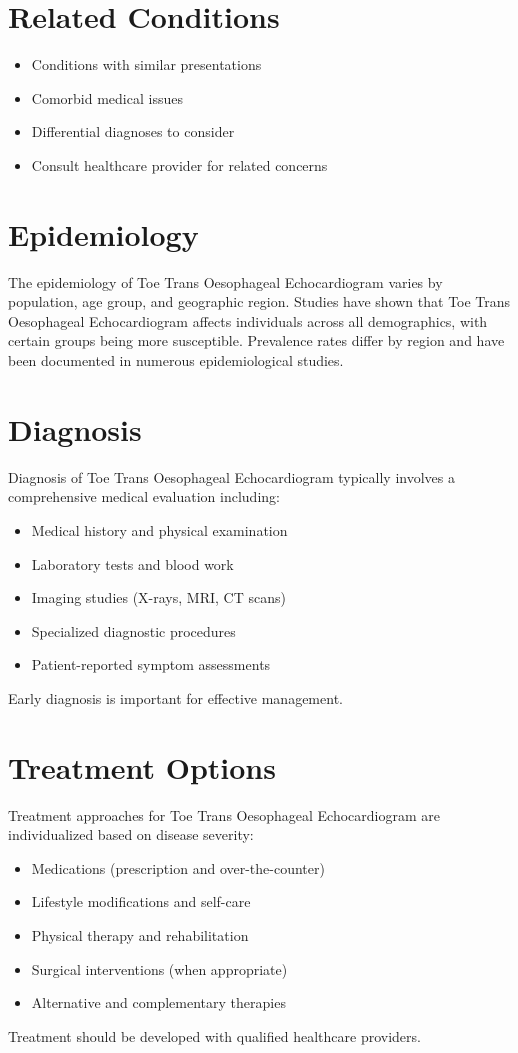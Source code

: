 \section*{Related Conditions}
\begin{itemize}
  \item Conditions with similar presentations
  \item Comorbid medical issues
  \item Differential diagnoses to consider
  \item Consult healthcare provider for related concerns
\end{itemize}

\section*{Epidemiology}
The epidemiology of Toe Trans Oesophageal Echocardiogram varies by population, age group, and geographic region. Studies have shown that Toe Trans Oesophageal Echocardiogram affects individuals across all demographics, with certain groups being more susceptible. Prevalence rates differ by region and have been documented in numerous epidemiological studies.

\section*{Diagnosis}
Diagnosis of Toe Trans Oesophageal Echocardiogram typically involves a comprehensive medical evaluation including:
\begin{itemize}
  \item Medical history and physical examination
  \item Laboratory tests and blood work
  \item Imaging studies (X-rays, MRI, CT scans)
  \item Specialized diagnostic procedures
  \item Patient-reported symptom assessments
\end{itemize}
Early diagnosis is important for effective management.

\section*{Treatment Options}
Treatment approaches for Toe Trans Oesophageal Echocardiogram are individualized based on disease severity:
\begin{itemize}
  \item Medications (prescription and over-the-counter)
  \item Lifestyle modifications and self-care
  \item Physical therapy and rehabilitation
  \item Surgical interventions (when appropriate)
  \item Alternative and complementary therapies
\end{itemize}
Treatment should be developed with qualified healthcare providers.

